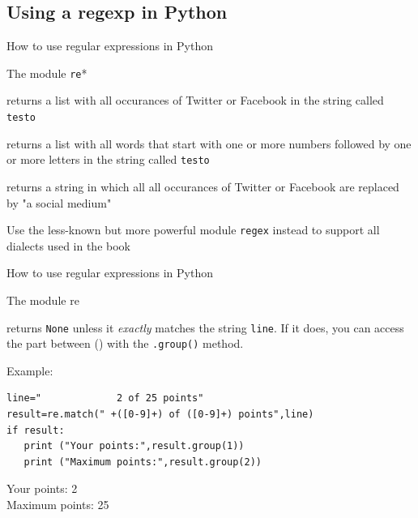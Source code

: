 \subsection{Using a regexp in Python}
\begin{frame}{How to use regular expressions in Python}
\begin{block}{The module \texttt{re}*}
\begin{description}
\item<1->[{\tt{re.findall("\lbrack Tt\rbrack witter|\lbrack Ff\rbrack acebook",testo)}}] returns a list with all occurances of Twitter or Facebook in the string called {\tt{testo}}
\item<1->[{\tt{re.findall("\lbrack 0-9\rbrack +\lbrack a-zA-Z\rbrack +",testo)}}] returns a list with all words that start with one or more numbers followed by one or more letters in the string called {\tt{testo}}
\item<2->[{\tt{re.sub("\lbrack Tt\rbrack witter|\lbrack Ff\rbrack acebook","a social medium",testo)}}] returns a string in which all all occurances of Twitter or Facebook are replaced by "a social medium"
\end{description}
\end{block}

\tiny{Use the less-known but more powerful module \texttt{regex} instead to support all dialects used in the book}
\end{frame}


\begin{frame}[fragile]{How to use regular expressions in Python}
\begin{block}{The module re}
\begin{description}
\item<1->[{\tt{re.match(" +(\lbrack 0-9\rbrack +) of (\lbrack 0-9\rbrack +) points",line)}}] returns  \texttt{None} unless it \emph{exactly} matches the string \texttt{line}. If it does, you can access the part between () with the \texttt{.group()} method.
\end{description}
\end{block}

Example:
\begin{lstlisting}
line="             2 of 25 points"
result=re.match(" +([0-9]+) of ([0-9]+) points",line)
if result:
   print ("Your points:",result.group(1))
   print ("Maximum points:",result.group(2))
\end{lstlisting}
Your points: 2\\
Maximum points: 25
\end{frame}







